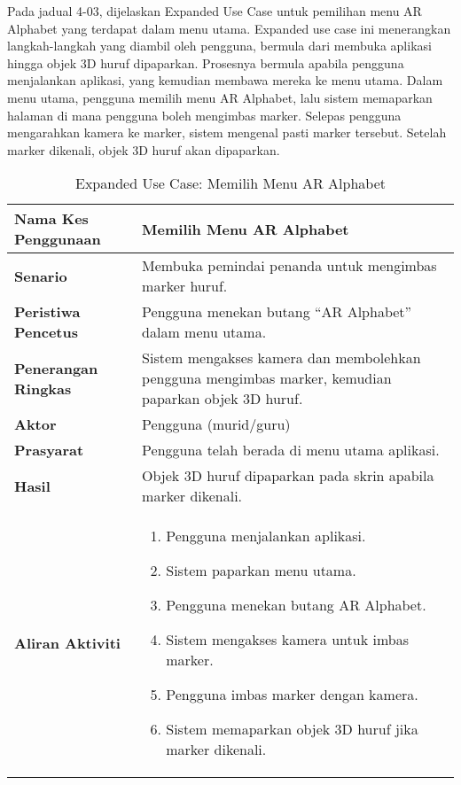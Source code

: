 \begin{itemize}
\begin{itemize}
\begin{itemize}
\begin{itemize}
\begin{itemize}
\begin{itemize}
\begin{itemize}
\begin{itemize}
Pada  jadual   4-03,   dijelaskan   Expanded  Use  Case  untuk  pemilihan  menu  AR  Alphabet  yang  terdapat  dalam  menu  utama.  Expanded  use  case  ini  menerangkan  langkah-langkah yang diambil oleh pengguna, bermula dari membuka aplikasi hingga  objek 3D huruf dipaparkan. Prosesnya bermula apabila pengguna menjalankan aplikasi, yang kemudian membawa mereka ke menu utama. Dalam menu utama, pengguna  memilih menu AR Alphabet, lalu sistem memaparkan halaman di mana pengguna  boleh mengimbas marker. Selepas pengguna mengarahkan kamera ke marker, sistem  mengenal  pasti  marker  tersebut.   Setelah  marker   dikenali,  objek  3D  huruf  akan  dipaparkan.
\begin{table}[htbp]
\centering
\caption{Expanded Use Case: Memilih Menu AR Alphabet}
\begin{tabular}{p{4cm}p{9cm}}
\toprule
\textbf{Nama Kes Penggunaan} & Memilih Menu AR Alphabet \\
\midrule
\textbf{Senario} & Membuka pemindai penanda untuk mengimbas marker huruf. \\

\textbf{Peristiwa Pencetus} & Pengguna menekan butang “AR Alphabet” dalam menu utama. \\

\textbf{Penerangan Ringkas} & Sistem mengakses kamera dan membolehkan pengguna mengimbas marker, kemudian paparkan objek 3D huruf. \\

\textbf{Aktor} & Pengguna (murid/guru) \\

\textbf{Prasyarat} & Pengguna telah berada di menu utama aplikasi. \\

\textbf{Hasil} & Objek 3D huruf dipaparkan pada skrin apabila marker dikenali. \\

\textbf{Aliran Aktiviti} & 
\begin{enumerate}
    \item Pengguna menjalankan aplikasi.
    \item Sistem paparkan menu utama.
    \item Pengguna menekan butang AR Alphabet.
    \item Sistem mengakses kamera untuk imbas marker.
    \item Pengguna imbas marker dengan kamera.
    \item Sistem memaparkan objek 3D huruf jika marker dikenali.
\end{enumerate} \\
\bottomrule
\end{tabular}
\end{table}



\end{itemize}
\end{itemize}
\end{itemize}
\end{itemize}
\end{itemize}
\end{itemize}
\end{itemize}
\end{itemize}
